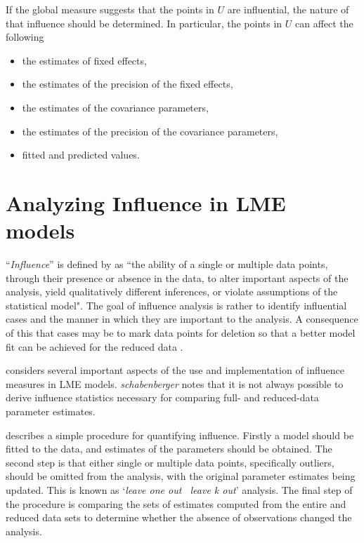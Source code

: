 \documentclass[Main.tex]{subfiles}
\begin{document}
		If the global measure suggests that the points in $U$ are influential, the nature of that influence should be determined. In particular, the points in $U$ can affect the following
		
		\begin{itemize}
			\item the estimates of fixed effects,
			\item the estimates of the precision of the fixed effects,
			\item the estimates of the covariance parameters,
			\item the estimates of the precision of the covariance parameters,
			\item fitted and predicted values.
		\end{itemize}
		
		\section{Analyzing Influence in LME models}
		``\textit{Influence}” is defined by \citet{schab} as ``the ability of a single or multiple data points, through their presence
		or absence in the data, to alter important aspects of the analysis, yield qualitatively different inferences, or
		violate assumptions of the statistical model". The goal of influence analysis is rather to identify influential cases and the manner in
		which they are important to the analysis. A consequence of this that cases may be to mark data
		points for deletion so that a better model fit can be achieved for the reduced data \citep{schab}.  
		
		
		
		\citet{schab} considers several important aspects of the use and implementation of influence measures in LME models. \textit{schabenberger} notes that it is not always possible to
		derive influence statistics necessary for comparing full- and reduced-data parameter estimates. 
		
		\citet{schab} describes a simple procedure for quantifying influence. Firstly a model should be fitted to the data, and
		estimates of the parameters should be obtained. The second step is that either single or multiple data points, specifically outliers,
		should be omitted from the analysis, with the original parameter estimates being updated. This is known as `\textit{leave one out \ leave k out}' analysis. The final step of the procedure is comparing the 	sets of estimates computed from the entire and reduced data sets to determine whether the absence of observations changed the
		analysis.
		
\end{document}
